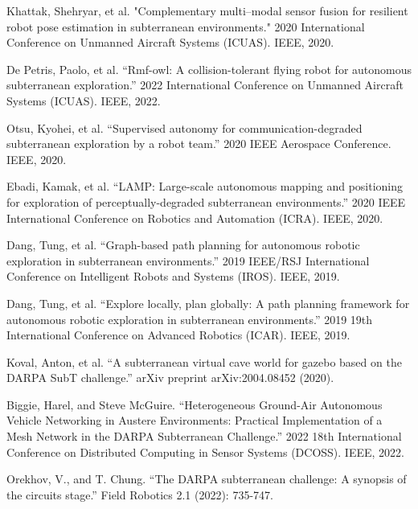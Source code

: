 
\begin{thebibliography}{99}

     Khattak, Shehryar, et al. "Complementary multi–modal sensor fusion for resilient robot pose estimation in subterranean environments." 2020 International Conference on Unmanned Aircraft Systems (ICUAS). IEEE, 2020.



	 De Petris, Paolo, et al. ``Rmf-owl: A collision-tolerant flying robot for autonomous subterranean exploration.'' 2022 International Conference on Unmanned Aircraft Systems (ICUAS). IEEE, 2022.
	
	Otsu, Kyohei, et al. ``Supervised autonomy for communication-degraded subterranean exploration by a robot team.'' 2020 IEEE Aerospace Conference. IEEE, 2020.
	
	 Ebadi, Kamak, et al. ``LAMP: Large-scale autonomous mapping and positioning for exploration of perceptually-degraded subterranean environments.'' 2020 IEEE International Conference on Robotics and Automation (ICRA). IEEE, 2020.
	
	 Dang, Tung, et al. ``Graph-based path planning for autonomous robotic exploration in subterranean environments.'' 2019 IEEE/RSJ International Conference on Intelligent Robots and Systems (IROS). IEEE, 2019.
	
	 Dang, Tung, et al. ``Explore locally, plan globally: A path planning framework for autonomous robotic exploration in subterranean environments.'' 2019 19th International Conference on Advanced Robotics (ICAR). IEEE, 2019.
	
	 Koval, Anton, et al. ``A subterranean virtual cave world for gazebo based on the DARPA SubT challenge.'' arXiv preprint arXiv:2004.08452 (2020).
	
	 Biggie, Harel, and Steve McGuire. ``Heterogeneous Ground-Air Autonomous Vehicle Networking in Austere Environments: Practical Implementation of a Mesh Network in the DARPA Subterranean Challenge.'' 2022 18th International Conference on Distributed Computing in Sensor Systems (DCOSS). IEEE, 2022.
	
	 Orekhov, V., and T. Chung. ``The DARPA subterranean challenge: A synopsis of the circuits stage.'' Field Robotics 2.1 (2022): 735-747.


\end{thebibliography}
